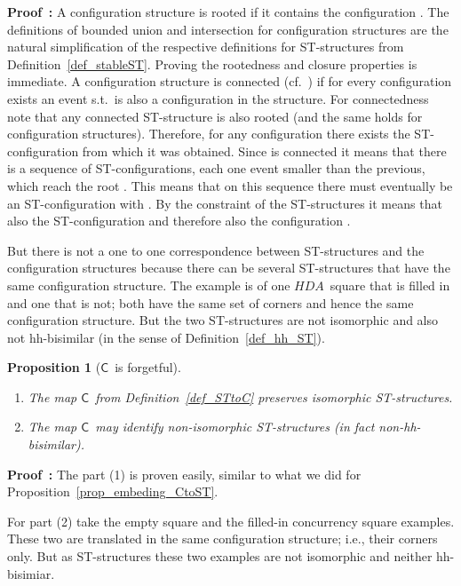\documentclass[submission,copyright,creativecommons]{eptcs}
\newtheorem{proposition}[theorem]{Proposition}
\newenvironment{proof}[1][\!\!\,]{\vspace{1ex}\noindent\textbf{Proof #1: }}{\hfill\vspace{2ex}}
\newcommand{\cp}[1]{}
\newcommand\HDA{\ensuremath{\mathit{HDA}}}
\newcommand\stintoc{\ensuremath{\mathsf{C}}}
\begin{document}
\begin{proof}
A configuration structure is rooted if it contains the configuration . The definitions of bounded union and intersection for configuration structures are the natural simplification of the respective definitions for ST-structures from Definition~\ref{def_stableST}. Proving the rootedness and closure properties is immediate. 
A configuration structure is connected (cf.\ \cite[Def.5.5]{GlabbeekG01refinement}) if for every configuration  exists an event  s.t.\  is also a configuration in the structure. For connectedness note that any connected ST-structure is also rooted (and the same holds for configuration structures). Therefore, for any configuration  there exists the ST-configuration  from which it was obtained. Since  is connected it means that there is a sequence of ST-configurations, each one event smaller than the previous, which reach the root . This means that on this sequence there must eventually be an ST-configuration  with . By the constraint of the ST-structures it means that also the ST-configuration  and therefore also the configuration .
\cp{!!Do this proof with the weaker constraint, so the last line needs redoing.}
\end{proof}



But there is not a one to one correspondence between ST-structures and the configuration structures because there can be several ST-structures that have the same configuration structure. The example is of one \HDA\ square that is filled in and one that is not; both have the same set of corners and hence the same configuration structure. But the two ST-structures are not isomorphic and also not hh-bisimilar (in the sense of Definition~\ref{def_hh_ST}).


\begin{proposition}[\stintoc\ is forgetful]\label{prop_forget_STtoC}
\ 

\begin{enumerate}
\item The map \stintoc\ from Definition~\ref{def_STtoC} preserves isomorphic ST-structures. 

\item The map \stintoc\ may identify non-isomorphic ST-structures (in fact non-hh-bisimilar).
\end{enumerate}
\end{proposition}

\begin{proof}
The part (1) is proven easily, similar to what we did for Proposition~\ref{prop_embeding_CtoST}.

For part (2) take the empty square and the filled-in concurrency square examples. These two are translated in the same configuration structure; i.e., their corners only. But as ST-structures these two examples are not isomorphic and neither hh-bisimiar.
\end{proof}
\end{document}
